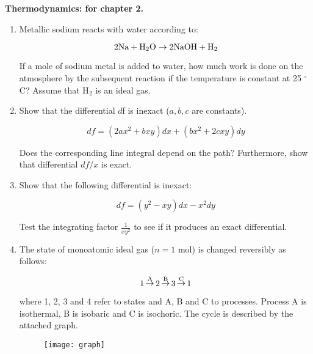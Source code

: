 \noindent
\textbf{Thermodynamics:
 for chapter 2.}\\

\begin{enumerate}

\item Metallic sodium reacts with water according to:

$$2\textnormal{Na} + \textnormal{H}_2\textnormal{O} \rightarrow 2\textnormal{NaOH} + \textnormal{H}_2$$

If a mole of sodium metal is added to water, how much work is done on the atmosphere by the subsequent reaction if the temperature is constant at 25 $^\circ$C? Assume that H$_2$ is an ideal gas.


\item Show that the differential $d$f is inexact ($a,b,c$ are constants).

$$df = \left(2ax^2 + bxy\right)dx + \left(bx^2 + 2cxy\right)dy$$

Does the corresponding line integral depend on the path? Furthermore, show that differential $df / x$ is exact.


\item Show that the following differential is inexact:

$$df = \left(y^2 - xy\right)dx - x^2dy$$

Test the integrating factor $\frac{1}{xy^2}$ to see if it produces an exact differential.


\item The state of monoatomic ideal gas ($n = 1$ mol) is changed reversibly as follows:

$$1 \mathop\rightarrow\limits^{\textnormal{A}} 2 \mathop\rightarrow\limits^{\textnormal{B}} 3 \mathop\rightarrow\limits^{\textnormal{C}} 1$$

where 1, 2, 3 and 4 refer to states and A, B and C to processes. Process A is isothermal, B is isobaric and C is isochoric. The cycle is described by the attached graph.

\begin{figure}[htp!]
\centering
\texttt{[image: graph]}
\end{figure}


\end{enumerate}
